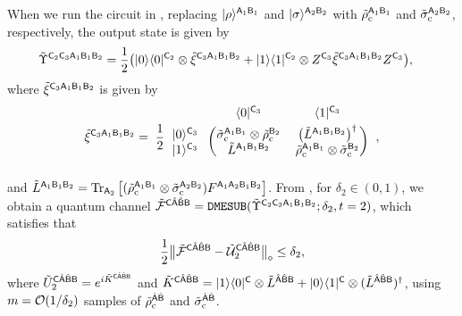 When we run the circuit in , replacing $|\rho\rangle^{{\mathsf{A}}_1{\mathsf{B}}_1}$ and $|\sigma\rangle^{{\mathsf{A}}_2{\mathsf{B}}_2}$ with $\tilde{\rho}_{\rm c}^{{\mathsf{A}}_1{\mathsf{B}}_1}$ and $\tilde{\sigma}_{\rm c}^{{\mathsf{A}}_2{\mathsf{B}}_2}$, respectively, the output state is given by 
\begin{align}
    &\tilde{\Upsilon}^{{\mathsf{C}}_2{\mathsf{C}}_3{\mathsf{A}}_1{\mathsf{B}}_1{\mathsf{B}}_2}
    =\frac{1}{2}\big(|0\rangle\langle0|^{{\mathsf{C}}_2} \otimes \tilde{\xi}^{{\mathsf{C}}_3{\mathsf{A}}_1{\mathsf{B}}_1{\mathsf{B}}_2} + |1\rangle\langle1|^{{\mathsf{C}}_2} \otimes Z^{{\mathsf{C}}_3}\tilde{\xi}^{{\mathsf{C}}_3{\mathsf{A}}_1{\mathsf{B}}_1{\mathsf{B}}_2}Z^{{\mathsf{C}}_3}\big),
\end{align}
where $\tilde{\xi}^{{\mathsf{C}}_3{\mathsf{A}}_1{\mathsf{B}}_1{\mathsf{B}}_2}$ is given by
\begin{align}
    \til{\xi}^{\sC_3\sA_1\sB_1\sB_2} 
    = \hspace{1mm} \f{1}{2}
\begin{blockarray}{ccc}
& \bra{0}^{\sC_3}&  \bra{1}^{\sC_3} \vspace{1mm}\\
\begin{block}{c(cc)}
  \ket{0}^{\sC_3}\hspace*{1mm} & \til{\sigma}_{\rm c}^{\sA_1\sB_1}\otimes \til{\rho}_{\rm c}^{\sB_2} & \big(\til{L}^{\sA_1\sB_1\sB_2}\big)^\dag \\
  \ket{1}^{\sC_3}\hspace*{1mm} & \til{L}^{\sA_1\sB_1\sB_2} & \til{\rho}_{\rm c}^{\sA_1\sB_1}\otimes \til{\sigma}_{\rm c}^{\sB_2} \\
\end{block}
\end{blockarray}\hspace{2.5mm},
\end{align}
and $\tilde{L}^{{\mathsf{A}}_1{\mathsf{B}}_1{\mathsf{B}}_2} = \operatorname{Tr}_{{\mathsf{A}}_2}\big[(\tilde{\rho}_{\rm c}^{{\mathsf{A}}_1{\mathsf{B}}_1}\otimes \tilde{\sigma}_{\rm c}^{{\mathsf{A}}_2{\mathsf{B}}_2})F^{{\mathsf{A}}_1{\mathsf{A}}_2{\mathsf{B}}_1{\mathsf{B}}_2}\big]$.
From , for $\delta_2 \in (0, 1)$, we obtain a quantum channel $\tilde{{\mathcal{F}}}^{{\mathsf{C}}\hat{{\mathsf{A}}}\hat{{\mathsf{B}}}{\mathsf{B}}} = \mathtt{DMESUB}(\tilde{\Upsilon}^{{\mathsf{C}}_2{\mathsf{C}}_3{\mathsf{A}}_1{\mathsf{B}}_1{\mathsf{B}}_2}; \delta_2, t=2)$, which satisfies that
\begin{align}
\label{inteq:46}
    \frac{1}{2}\big\|\tilde{{\mathcal{F}}}^{{\mathsf{C}}\hat{{\mathsf{A}}}\hat{{\mathsf{B}}}{\mathsf{B}}} - \tilde{{\mathcal{U}}}_2^{{\mathsf{C}}\hat{{\mathsf{A}}}\hat{{\mathsf{B}}}{\mathsf{B}}}\big\|_\diamond \leq \delta_2,
\end{align}
where $\tilde{U}_2^{{\mathsf{C}}\hat{{\mathsf{A}}}\hat{{\mathsf{B}}}{\mathsf{B}}} = e^{i\tilde{K}^{{\mathsf{C}}\hat{{\mathsf{A}}}\hat{{\mathsf{B}}}{\mathsf{B}}}}$
and $\tilde{K}^{{\mathsf{C}}\hat{{\mathsf{A}}}\hat{{\mathsf{B}}}{\mathsf{B}}} = |1\rangle\langle0|^{\mathsf{C}} \otimes \tilde{L}^{\hat{{\mathsf{A}}}\hat{{\mathsf{B}}}{\mathsf{B}}} + |0\rangle\langle1|^{\mathsf{C}} \otimes (\tilde{L}^{\hat{{\mathsf{A}}}\hat{{\mathsf{B}}}{\mathsf{B}}})^\dag$, using $m = {\mathcal{O}}(1/\delta_2)$ samples of $\tilde{\rho}_{\rm c}^{\hat{{\mathsf{A}}}\hat{{\mathsf{B}}}}$ and $\tilde{\sigma}_{\rm c}^{\hat{{\mathsf{A}}}\hat{{\mathsf{B}}}}$.



